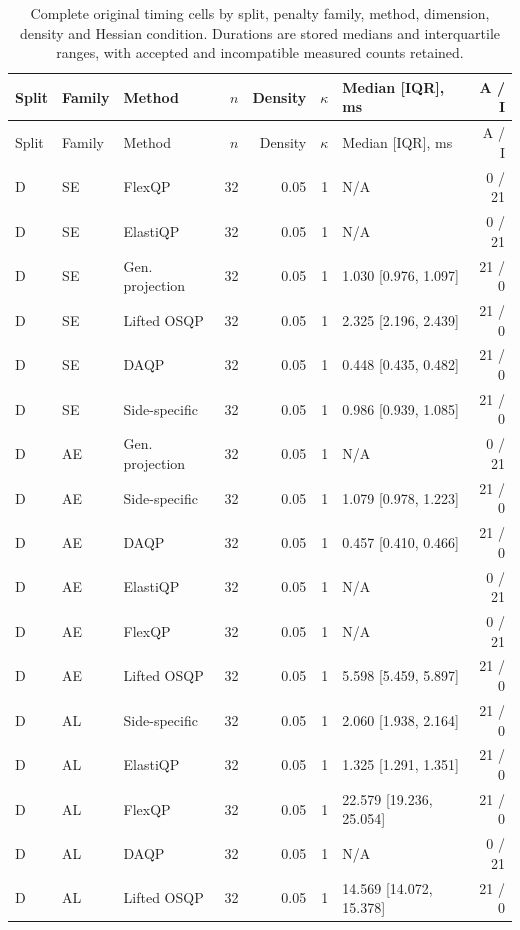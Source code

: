\begingroup\footnotesize\setlength{\tabcolsep}{3pt}
\begin{longtable}{@{}lllrrrlr@{}}
\caption{Complete original timing cells by split, penalty family, method, dimension, density and Hessian condition. Durations are stored medians and interquartile ranges, with accepted and incompatible measured counts retained.}\label{tab:timing-cells}\\
\toprule
Split & Family & Method & $n$ & Density & $\kappa$ & Median [IQR], ms & A / I \\
\midrule
\endfirsthead
\toprule
Split & Family & Method & $n$ & Density & $\kappa$ & Median [IQR], ms & A / I \\
\midrule
\endhead
\bottomrule
\endlastfoot
D & SE & FlexQP & 32 & 0.05 & 1 & N/A & 0 / 21 \\
D & SE & ElastiQP & 32 & 0.05 & 1 & N/A & 0 / 21 \\
D & SE & Gen. projection & 32 & 0.05 & 1 & 1.030 [0.976, 1.097] & 21 / 0 \\
D & SE & Lifted OSQP & 32 & 0.05 & 1 & 2.325 [2.196, 2.439] & 21 / 0 \\
D & SE & DAQP & 32 & 0.05 & 1 & 0.448 [0.435, 0.482] & 21 / 0 \\
D & SE & Side-specific & 32 & 0.05 & 1 & 0.986 [0.939, 1.085] & 21 / 0 \\
D & AE & Gen. projection & 32 & 0.05 & 1 & N/A & 0 / 21 \\
D & AE & Side-specific & 32 & 0.05 & 1 & 1.079 [0.978, 1.223] & 21 / 0 \\
D & AE & DAQP & 32 & 0.05 & 1 & 0.457 [0.410, 0.466] & 21 / 0 \\
D & AE & ElastiQP & 32 & 0.05 & 1 & N/A & 0 / 21 \\
D & AE & FlexQP & 32 & 0.05 & 1 & N/A & 0 / 21 \\
D & AE & Lifted OSQP & 32 & 0.05 & 1 & 5.598 [5.459, 5.897] & 21 / 0 \\
D & AL & Side-specific & 32 & 0.05 & 1 & 2.060 [1.938, 2.164] & 21 / 0 \\
D & AL & ElastiQP & 32 & 0.05 & 1 & 1.325 [1.291, 1.351] & 21 / 0 \\
D & AL & FlexQP & 32 & 0.05 & 1 & 22.579 [19.236, 25.054] & 21 / 0 \\
D & AL & DAQP & 32 & 0.05 & 1 & N/A & 0 / 21 \\
D & AL & Lifted OSQP & 32 & 0.05 & 1 & 14.569 [14.072, 15.378] & 21 / 0 \\

\end{longtable}
